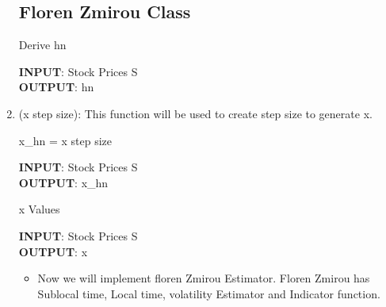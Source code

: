 \begin{enumerate}
\subsection{Floren Zmirou Class}
\begin{algorithm}
\caption{Derive hn}
\bigskip
\textbf{INPUT}: Stock Prices S\\
\textbf{OUTPUT}: hn
\end{algorithm}
\item (x step size): This function will be used  to create step size to generate x.
\begin{algorithm}
\caption{x\_hn = x step size}
\bigskip
\textbf{INPUT}: Stock Prices S\\
\textbf{OUTPUT}: x\_hn
\end{algorithm}
\begin{algorithm}
\caption { x Values}
\bigskip
\textbf{INPUT}: Stock Prices S\\
\textbf{OUTPUT}: x
\end{algorithm}
\newpage
\begin{itemize}
  \item Now we will implement floren Zmirou Estimator. Floren Zmirou has Sublocal time, Local time, volatility Estimator and Indicator function.

\end{itemize}
\end{enumerate}
